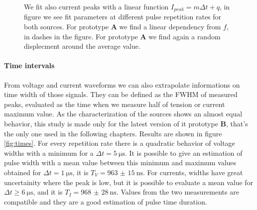 \begin{figure}
 \centering
 \hfill
 \caption{We fit also current peaks with a linear function $I_{peak} = m \Delta t + q$, in figure we see fit parameters at different pulse repetition rates for both sources. For prototype \textbf{A} we find a linear dependency from $f$, in dashes in the figure. For prototype \textbf{A} we find again a random displecment around the average value.}
 \label{fig:lingas_I}
\end{figure}

\paragraph{Time intervals}
From voltage and current waveforms we can also extrapolate informations on time width of those signals. They can be defined as the FWHM of measured peaks, evaluated as the time when we measure half of tension or current maximum value. As the characterization of the sources shows an almost equal behavior, this study is made only for the latest version of it prototype \textbf{B}, that's the only one used in the following chapters. Results are shown in figure \ref{fig:times}.
For every repetition rate there is a quadratic behavior of voltage widths with a minimum for a $\Delta t = \SI{5}{\micro\second}$. It is possible to give an estimation of pulse width with a mean value between this minimum and maximum values obtained for $\Delta t = \SI{1}{\micro\second}$, it is $T_{V} = \SI{963(15)}{\nano\second}$. For currents, widths have great uncertainity where the peak is low, but it is possible to evaluate a mean value for $\Delta t \ge \SI{6}{\micro\second}$, and it is $T_{I} = \SI{968(28)}{\nano\second}$.
Values from the two measurements are compatible and they are a good estimation of pulse time duration.

